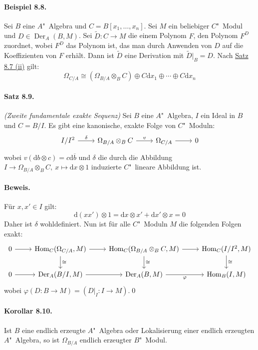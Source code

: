 \paragraph{Beispiel 8.8.}\label{8.8} Sei $B$ eine $A$"~Algebra und $C=B[x_1,\ldots,x_n]$. Sei $M$ ein beliebiger $C$"~Mo\-dul und $D\in\operatorname{Der}_A(B,M)$. Sei $\widetilde{D}:C\to M$ die einem Polynom $F$, den Polynom $F^D$ zuordnet, wobei $F^D$ das Polynom ist, das man durch Anwenden von $D$ auf die Koeffizienten von $F$ erhält. Dann ist $\widetilde{D}$ eine Derivation mit $\widetilde{D}|_B=D$. Nach \hyperref[8.7]{Satz 8.7 (ii)} gilt:
\[\Omega_{C/A}\cong (\Omega_{B/A}\otimes_BC)\oplus C\mathrm{d}x_1\oplus\cdots\oplus C\mathrm{d}x_n \]

\paragraph{Satz 8.9.}\label{8.9}\textit{(Zweite fundamentale exakte Sequenz)} Sei $B$ eine $A$"~Algebra, $I$ ein Ideal in $B$ und $C=B/I$. Es gibt eine kanonische, exakte Folge von $C$"~Moduln:
\[\begin{tikzcd}
I/I^2\rar["\delta"] & \Omega_{B/A}\otimes_BC\rar["v"] & \Omega_{C/A}\rar & 0
\end{tikzcd} \]
wobei $v(\mathrm{d}b\otimes c)= c\mathrm{d}\overline{b}$ und $\delta$ die durch die Abbildung $I\to\Omega_{B/A}\otimes_BC,\ x\mapsto \mathrm{d}x\otimes 1$ induzierte $C$"~lineare Abbildung ist.

\paragraph{Beweis.} Für $x,x'\in I$ gilt:
\[\mathrm{d}(xx')\otimes 1 = \mathrm{d}x\otimes x' + \mathrm{d}x'\otimes x =0 \]
Daher ist $\delta$ wohldefiniert. Nun ist für alle $C$"~Moduln $M$ die folgenden Folgen exakt:
\[\begin{tikzcd}
0 \rar & \operatorname{Hom}_C(\Omega_{C/A},M)\dar["\cong"] \rar & \operatorname{Hom}_C(\Omega_{B/A}\otimes_BC,M)\dar["\cong"] \rar & \operatorname{Hom}_C(I/I^2,M)\dar["\cong"]\\
0 \rar & \operatorname{Der}_A(B/I,M) \rar & \operatorname{Der}_A(B,M) \rar["\varphi"'] & \operatorname{Hom}_B(I,M)
\end{tikzcd} \]
wobei $\varphi(D:B\to M) = (D|_I:I\to M)$.\qed

\paragraph{Korollar 8.10.}\label{8.10} Ist $B$ eine endlich erzeugte $A$"~Algebra oder Lokalisierung einer endlich erzeugten $A$"~Algebra, so ist $\Omega_{B/A}$ endlich erzeugter $B$"~Modul.

